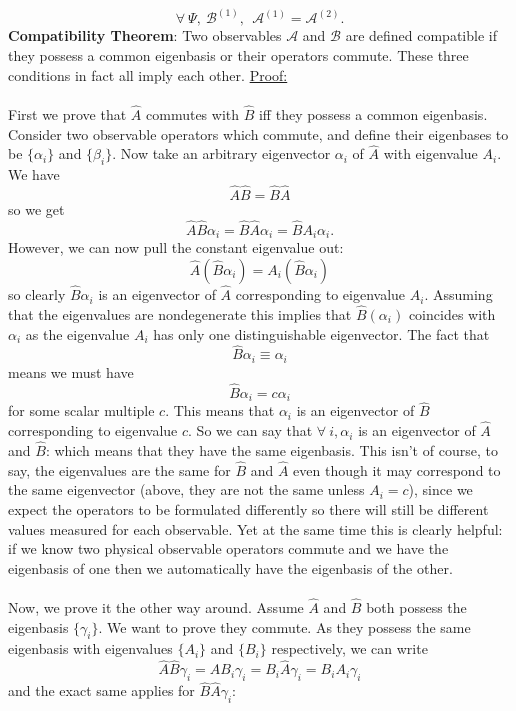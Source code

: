 $$
\forall\:\Psi,\:\mathcal{B}^{(1)},\:\:\mathcal{A}^{(1)}=\mathcal{A}^{(2)}.
$$
\Answer
\textbf{Compatibility Theorem}: Two observables $\mathcal{A}$ and $\mathcal{B}$ are defined compatible if they possess a common eigenbasis or their operators commute. These three conditions in fact all imply each other.
\Answerend
\underline{Proof:}
\\\\
First we prove that $\hat{A}$ commutes with $\hat{B}$ iff they possess a common eigenbasis. Consider two observable operators which commute, and define their eigenbases to be $\{\alpha_{i}\}$ and $\{\beta_{i}\}$. Now take an arbitrary eigenvector $\alpha_{i}$ of $\hat{A}$ with eigenvalue $A_{i}$. We have
$$
\hat{A}\hat{B}=\hat{B}\hat{A}
$$
so we get 
$$
\hat{A}\hat{B}\alpha_{i}=\hat{B}\hat{A}\alpha_{i}=\hat{B}A_{i}\alpha_{i}.
$$
However, we can now pull the constant eigenvalue out:
$$
\hat{A}(\hat{B}\alpha_{i})=A_{i}(\hat{B}\alpha_{i})
$$
so clearly $\hat{B}\alpha_{i}$ is an eigenvector of $\hat{A}$ corresponding to eigenvalue $A_{i}$. Assuming that the eigenvalues are nondegenerate this implies that $\hat{B}(\alpha_{i})$ coincides with $\alpha_{i}$ as the eigenvalue $A_{i}$ has only one distinguishable eigenvector. The fact that 
$$
\hat{B}\alpha_{i}\equiv\alpha_{i}
$$
means we must have
$$
\hat{B}\alpha_{i}=c\alpha_{i}
$$
for some scalar multiple $c$. This means that $\alpha_{i}$ is an eigenvector of $\hat{B}$ corresponding to eigenvalue $c$. So we can say that $\forall\:i, \alpha_{i}$ is an eigenvector of $\hat{A}$ and $\hat{B}$: which means that they have the same eigenbasis. This isn't of course, to say, the eigenvalues are the same for $\hat{B}$ and $\hat{A}$ even though it may correspond to the same eigenvector (above, they are not the same unless $A_{i}=c$), since we expect the operators to be formulated differently so there will still be different values measured for each observable. Yet at the same time this is clearly helpful: if we know two physical observable operators commute and we have the eigenbasis of one then we automatically have the eigenbasis of the other. 
\\\\
Now, we prove it the other way around. Assume $\hat{A}$ and $\hat{B}$ both possess the eigenbasis $\{\gamma_{i}\}$. We want to prove they commute. As they possess the same eigenbasis with eigenvalues $\{A_{i}\}$ and $\{B_{i}\}$ respectively, we can write
$$
\hat{A}\hat{B}\gamma_{i}=\hat{A}B_{i}\gamma_{i}=B_{i}\hat{A}\gamma_{i}=B_{i}A_{i}\gamma_{i}
$$
and the exact same applies for $\hat{B}\hat{A}\gamma_{i}$:
